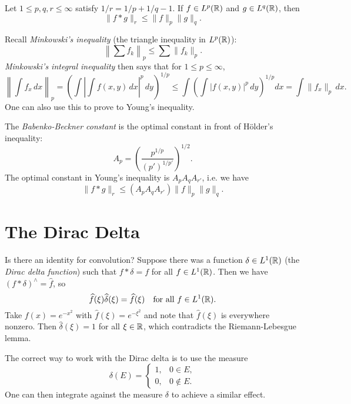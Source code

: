 \begin{exercise}
  Let $1 \le p, q, r \le \infty$ satisfy
  $1 / r = 1 / p + 1 / q - 1$.
  If $f \in L^p(\mathbb{R})$ and
  $g \in L^q(\mathbb{R})$, then
  \[
    \|f * g\|_r \le \|f\|_p \|g\|_q.
  \]
\end{exercise}

\begin{remark}
  Recall \emph{Minkowski's inequality}
  (the triangle inequality in $L^p(\mathbb{R})$):
  \[
    \left\| \sum f_k \right\|_p
    \le \sum \|f_k\|_p.
  \]
  \emph{Minkowski's integral inequality}
  then says that for $1 \le p \le \infty$,
  \[
    \left\|\int f_x\, dx \right\|_p
    = \left(\int \left|\int f(x, y)\, dx\right|^p\, dy\right)^{1 / p}
    \le \int \left(\int |f(x, y)|^p\, dy\right)^{1 / p} dx
    = \int \|f_x\|_p\, dx.
  \]
  One can also use this to prove to
  Young's inequality.
\end{remark}

\begin{remark}
  The \emph{Babenko-Beckner constant}
  is the optimal constant in front
  of H\"older's inequality:
  \[
    A_p = \left(\frac{p^{1 / p}}{(p')^{1 / p'}}\right)^{1 / 2}.
  \]
  The optimal constant in Young's inequality
  is $A_p A_q A_{r'}$, i.e. we have
  \[
    \|f * g\|_r
    \le (A_p A_q A_{r'}) \|f\|_p \|g\|_q.
  \]
\end{remark}

\section{The Dirac Delta}

\begin{remark}
  Is there an identity for convolution?
  Suppose there was a function
  $\delta \in L^1(\mathbb{R})$ (the \emph{Dirac delta function}) such that
  $f * \delta = f$ for all
  $f \in L^1(\mathbb{R})$. Then we have
  $(f * \delta)^\wedge = \widehat{f}$,
  so
  \[
    \widehat{f}(\xi) \widehat{\delta}(\xi)
    = \widehat{f}(\xi)
    \quad \text{for all } f \in L^1(\mathbb{R}).
  \]
  Take $f(x) = e^{-x^2}$ with
  $\widehat{f}(\xi) = e^{-\xi^2}$ and
  note that $\widehat{f}(\xi)$ is
  everywhere nonzero. Then
  $\widehat{\delta}(\xi) = 1$ for
  all $\xi \in \mathbb{R}$, which contradicts the
  Riemann-Lebesgue lemma.

  The correct way to work with the
  Dirac delta is to use the measure
  \[
    \delta(E) =
    \begin{cases}
      1, & 0 \in E, \\
      0, & 0 \notin E.
    \end{cases}
  \]
  One can then integrate against
  the measure $\delta$ to achieve a
  similar effect.
\end{remark}
